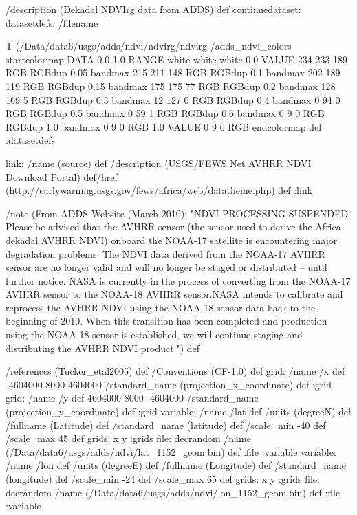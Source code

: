 \begin{ingrid}
/description (Dekadal NDVIrg data from ADDS) def
continuedataset:
datasetdefs:
/filename {T (/Data/data6/usgs/adds/ndvi/ndvirg/ndvirg%
/adds_ndvi_colors {
startcolormap
DATA 0.0 1.0 RANGE
white white white 0.0 VALUE
234 233 189 RGB RGBdup 0.05 bandmax
215 211 148 RGB RGBdup 0.1 bandmax
202 189 119 RGB RGBdup 0.15 bandmax
175 175 77 RGB RGBdup 0.2 bandmax
128 169 5 RGB RGBdup 0.3 bandmax
12 127 0 RGB RGBdup 0.4 bandmax
0 94 0 RGB RGBdup 0.5 bandmax
0 59 1 RGB RGBdup 0.6 bandmax
0 9 0 RGB RGBdup 1.0 bandmax
0 9 0 RGB 1.0 VALUE
0 9 0 RGB
endcolormap } def
:datasetdefs

link:
/name (source) def
/description (USGS/FEWS Net AVHRR NDVI Download Portal) def/href
(http://earlywarning.usgs.gov/fews/africa/web/datatheme.php) def
:link

/note (From ADDS Website (March 2010): "NDVI PROCESSING SUSPENDED  Please be advised that the AVHRR sensor (the sensor used to derive the Africa dekadal AVHRR NDVI) onboard the NOAA-17 satellite is encountering major degradation problems. The NDVI data derived from the NOAA-17 AVHRR sensor are no longer valid and will no longer be staged or distributed -- until further notice. NASA is currently in the process of converting from the NOAA-17 AVHRR sensor to the NOAA-18 AVHRR sensor.NASA intends to calibrate and reprocess the AVHRR NDVI using the NOAA-18 sensor data back to the beginning of 2010. When this transition has been completed and production using the NOAA-18 sensor is established, we will continue staging and distributing the AVHRR NDVI product.") def

/references (Tucker_etal2005) def
/Conventions (CF-1.0) def
grid:
/name /x def
-4604000 8000 4604000 
/standard_name (projection_x_coordinate) def
:grid
grid:
/name /y def
4604000 8000 -4604000
/standard_name (projection_y_coordinate) def
:grid
variable:
        /name /lat def
        /units (degreeN) def
        /fullname (Latitude) def
	/standard_name (latitude) def
        /scale_min -40 def
        /scale_max 45 def
        grids: x y :grids
        file:
                decrandom
                /name (/Data/data6/usgs/adds/ndvi/lat_1152_geom.bin) def
        :file
:variable
variable:
        /name /lon def
        /units (degreeE) def
        /fullname (Longitude) def
	/standard_name (longitude) def
        /scale_min -24 def
        /scale_max 65 def
        grids: x y :grids
        file:
                decrandom
                /name (/Data/data6/usgs/adds/ndvi/lon_1152_geom.bin) def
        :file
:variable

}
\end{ingrid}
